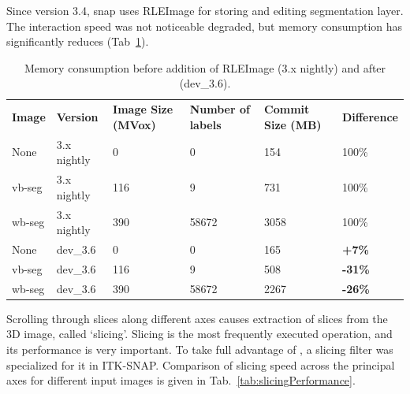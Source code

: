 \documentclass{InsightArticle}
\begin{document}
Since version 3.4, snap uses RLEImage for storing and editing segmentation layer.
The interaction speed was not noticeable degraded,
but memory consumption has significantly reduces (Tab~\ref{tab:memoryConsumption}).

\begin{table}[h]
	\centering
		\begin{tabular}{llllll}
		\textbf{Image} & \textbf{Version} & \textbf{Image Size (MVox)} & \textbf{Number of labels} & \textbf{Commit Size (MB)} & \textbf{Difference}            \\
		None           & 3.x nightly      & 0                          & 0                         & 154                       & 100\%                          \\
		vb-seg         & 3.x nightly      & 116                        & 9                         & 731                       & 100\%                          \\
		wb-seg         & 3.x nightly      & 390                        & 58672                     & 3058                      & 100\%                          \\
		None           & dev\_3.6         & 0                          & 0                         & 165                       & {\color{red} \textbf{+7\%}}    \\
		vb-seg         & dev\_3.6         & 116                        & 9                         & 508                       & {\color{green} \textbf{-31\%}} \\
		wb-seg         & dev\_3.6         & 390                        & 58672                     & 2267                      & {\color{green} \textbf{-26\%}}
		\end{tabular}
	\caption{Memory consumption before addition of RLEImage (3.x nightly) and after (dev\_3.6).}
	\label{tab:memoryConsumption}
\end{table}

Scrolling through slices along different axes causes
extraction of slices from the 3D image, called `slicing'.
Slicing is the most frequently executed operation, and its performance is very important.
To take full advantage of ,
a slicing filter was specialized for it in ITK-SNAP.
Comparison of slicing speed across the principal axes for different input images
is given in Tab.~\ref{tab:slicingPerformance}.
\end{document}
